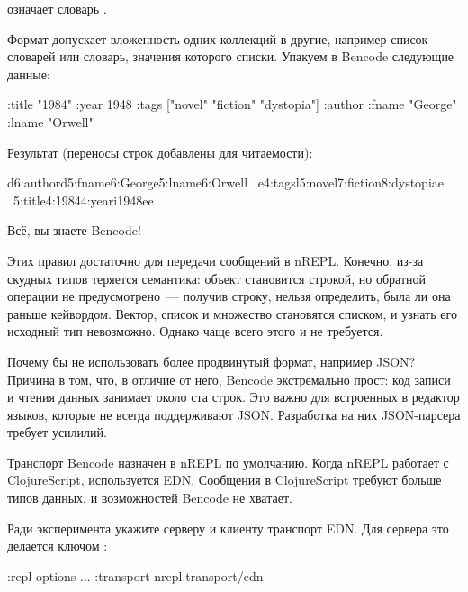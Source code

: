 \noindent
означает словарь .

Формат допускает вложенность одних коллекций в другие, например список словарей или словарь, значения которого списки. Упакуем в Bencode следующие данные:

\begin{english}
  \begin{clojure}
{:title "1984"
 :year 1948
 :tags ["novel" "fiction" "dystopia"]
 :author {:fname "George" :lname "Orwell"}}
  \end{clojure}
\end{english}

Результат (переносы строк добавлены для читаемости):

\begin{english}
  \begin{text}
d6:authord5:fname6:George5:lname6:Orwell \
e4:tagsl5:novel7:fiction8:dystopiae \
5:title4:19844:yeari1948ee
  \end{text}
\end{english}

Всё, вы знаете Bencode!

Этих правил достаточно для передачи сообщений в nREPL. Конечно, из-за скудных типов теряется семантика: объект  становится строкой, но обратной операции не предусмотрено~--- получив строку, нельзя определить, была ли она раньше кейвордом. Вектор, список и множество становятся списком, и узнать его исходный тип невозможно. Однако чаще всего этого и не требуется.

Почему бы не использовать более продвинутый формат, например JSON? Причина в том, что, в отличие от него, Bencode экстремально прост: код записи и чтения данных занимает около ста строк. Это важно для встроенных в редактор языков, которые не всегда поддерживают JSON. Разработка на них JSON-парсера требует усилилий.

Транспорт Bencode назначен в nREPL по умолчанию. Когда nREPL работает с ClojureScript, используется EDN. Сообщения в ClojureScript требуют больше типов данных, и возможностей Bencode не хватает.

Ради эксперимента укажите серверу и клиенту транспорт EDN. Для сервера это делается ключом \code{:repl-options}:

\begin{english}
  \begin{clojure}
:repl-options {...
               :transport nrepl.transport/edn}
  \end{clojure}
\end{english}

